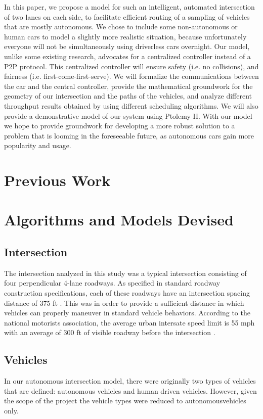 \documentclass[10pt]{article}
\begin{document}
In this paper, we propose a model for such an intelligent, automated intersection of two lanes on each side, to facilitate efficient routing of a sampling of vehicles that are mostly autonomous. We chose to include some non-autonomous or human cars to model a slightly more realistic situation, because unfortunately everyone will not be simultaneously using driverless cars overnight. Our model, unlike some existing research, advocates for a centralized controller instead of a P2P protocol. This centralized controller will ensure safety (i.e. no collisions), and fairness (i.e. first-come-first-serve). We will formalize the communications between the car and the central controller, provide the mathematical groundwork for the geometry of our intersection and the paths of the vehicles, and analyze different throughput results obtained by using different scheduling algorithms. We will also provide a demonstrative model of our system using Ptolemy II. With our model we hope to provide groundwork for developing a more robust solution to a problem that is looming in the foreseeable future, as autonomous cars gain more popularity and usage. 

\section{Previous Work}



\section{Algorithms and Models Devised}



\subsection{Intersection}

The intersection analyzed in this study was a typical intersection consisting of four perpendicular 4-lane roadways.   As specified in standard roadway construction specifications, each of these roadways have an intersection spacing distance of 375 ft \cite{Bureau}.
This was in order to provide a sufficient distance in which vehicles can properly maneuver in standard vehicle behaviors. 
According to the national motorists association, the average urban intersate speed limit is 55 mph with an average of 300 ft of visible roadway before the intersection \cite{Motorists}.

\subsection{Vehicles}
In our autonomous intersection model, there were originally two types of vehicles that are defined: autonomous vehicles and human driven vehicles.  However, given the scope of the project the vehicle types were reduced to autonomousvehicles only.
  
\end{document}
